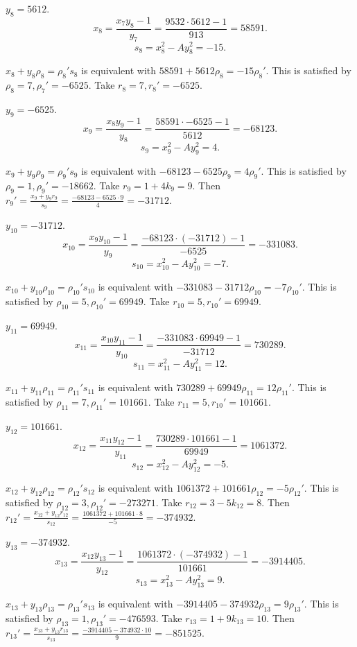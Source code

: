 \documentclass{article}
\theoremstyle{definition}
\theoremstyle{definition}
\begin{document}
$y_8=5612$.
\[
x_8 = \frac{x_7y_8-1}{y_7} = \frac{9532 \cdot 5612-1}{913} = 58591.
\]
\[
s_8 = x_8^2 - Ay_8^2 = -15.
\]

$x_8+y_8\rho_8=\rho_8's_8$ is equivalent with
$58591+5612\rho_8=-15\rho_8'$. This is satisfied by
$\rho_8=7, \rho_7'=-6525$.
Take $r_8=7, r_8'=-6525$.

$y_9=-6525$.
\[
x_9 = \frac{x_8y_9-1}{y_8} = \frac{58591 \cdot -6525-1}{5612} = -68123.
\]
\[
s_9 = x_9^2 - Ay_9^2 = 4.
\]


$x_9+y_9\rho_9=\rho_9's_9$ is equivalent with
$-68123 - 6525\rho_9=4 \rho_9'$. This is satisfied by
$\rho_9=1, \rho_9'=-18662$.
Take $r_9=1+4k_9 = 9$. Then
$r_9' = \frac{x_9+y_9r_9}{s_9} = \frac{-68123 - 6525 \cdot 9}{4} =  -31712$.

$y_{10}=-31712$.
\[
x_{10} = \frac{x_9y_{10}-1}{y_9} = \frac{-68123 \cdot (-31712)-1}{-6525} = -331083.
\]
\[
s_{10} = x_{10}^2 - Ay_{10}^2 =  -7.
\]

$x_{10}+y_{10} \rho_{10} =\rho_{10}'s_{10}$ is equivalent with
$-331083 - 31712\rho_{10}= - 7 \rho_{10}'$. This is satisfied by
$\rho_{10}=5, \rho_{10}'=69949$.
Take $r_{10}=5, r_{10}'=69949$.

$y_{11}=69949$.
\[
x_{11} = \frac{x_{10}y_{11}-1}{y_{10}} = \frac{-331083 \cdot 69949-1}{-31712} = 730289.
\]
\[
s_{11} = x_{11}^2 - Ay_{11}^2 =  12.
\]

$x_{11}+y_{11} \rho_{11} =\rho_{11}'s_{11}$ is equivalent with
$730289 +69949\rho_{11}= 12 \rho_{11}'$. This is satisfied by
$\rho_{11}=7, \rho_{11}'=101661$.
Take $r_{11}=5, r_{10}'=101661$.

$y_{12}=101661$.
\[
x_{12} = \frac{x_{11}y_{12}-1}{y_{11}} = \frac{730289 \cdot 101661-1}{69949} = 1061372.
\]
\[
s_{12} = x_{12}^2 - Ay_{12}^2 =  -5.
\]





$x_{12}+y_{12} \rho_{12} =\rho_{12}'s_{12}$ is equivalent with
$1061372 +101661\rho_{12}= -5 \rho_{12}'$. This is satisfied by
$\rho_{12}=3, \rho_{12}'=-273271$.
Take $r_{12}=3-5k_{12} = 8$.
Then $r_{12}'= \frac{x_{12}+y_{12}r_{12}}{s_{12}}
=\frac{1061372 + 101661 \cdot 8}{-5}=-374932$.

$y_{13}=-374932$.
\[
x_{13} = \frac{x_{12}y_{13}-1}{y_{12}} = \frac{1061372 \cdot (-374932)-1}{101661} = -3914405.
\]
\[
s_{13} = x_{13}^2 - Ay_{13}^2 =  9.
\]

$x_{13}+y_{13} \rho_{13} =\rho_{13}'s_{13}$ is equivalent with
$-3914405-374932\rho_{13}= 9 \rho_{13}'$. This is satisfied by
$\rho_{13}=1, \rho_{13}'=-476593$.
Take $r_{13}=1+9k_{13} = 10$.
Then $r_{13}'= \frac{x_{13}+y_{13}r_{13}}{s_{13}}
=\frac{-3914405 -374932 \cdot 10}{9}=-851525$.
\end{document}
